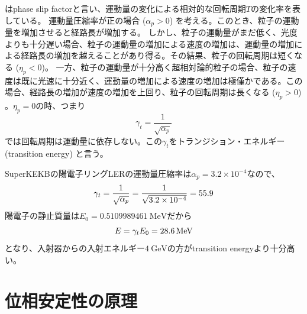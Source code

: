 \documentclass[]{jlreq}
\begin{document}
%
はphase slip factorと言い、運動量の変化による相対的な回転周期$T$の変化率を表している。
%
運動量圧縮率が正の場合 ($\alpha_p>0$) を考える。このとき、粒子の運動量を増加させると経路長が増加する。 しかし、粒子の運動量がまだ低く、光度よりも十分遅い場合、粒子の運動量の増加による速度の増加は、運動量の増加による経路長の増加を越えることがあり得る。その結果、粒子の回転周期は短くなる ($\eta_p < 0$)。
一方、粒子の運動量が十分高く超相対論的粒子の場合、粒子の速度は既に光速に十分近く、運動量の増加による速度の増加は極僅かである。この場合、経路長の増加が速度の増加を上回り、粒子の回転周期は長くなる ($\eta_p>0$) 。$\eta_p = 0$の時、つまり
%
\begin{equation}
  \gamma_t = \frac{1}{\sqrt{\alpha_p}}
\end{equation}
%
では回転周期は運動量に依存しない。この$\gamma_t$をトランジション・エネルギー (transition energy) と言う。

\vspace{\baselineskip}

\begin{tcolorbox}[title=\textgt{SuperKEKB LERのtransition energy}]
  SuperKEKBの陽電子リングLERの運動量圧縮率は$\alpha_p = 3.2 \times 10^{-4}$なので、
  \begin{equation}
    \gamma_t = \frac{1}{\sqrt{\alpha_p}}= \frac{1}{\sqrt{3.2 \times 10^{-4}}} = 55.9 \notag
  \end{equation}
  陽電子の静止質量は$E_0 = \SI{0.5109989461}{\mega\electronvolt}$だから
  \begin{equation}
    E = \gamma_t E_0 = \SI{28.6}{\mega\electronvolt} \notag
  \end{equation}
  となり、入射器からの入射エネルギー$\SI{4}{\giga\electronvolt}$の方がtransition energyより十分高い。
\end{tcolorbox}

\section{位相安定性の原理}
\end{document}
